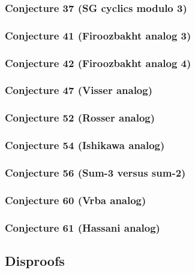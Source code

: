 \documentclass[12pt]{article}
\theoremstyle{remark}
\begin{document}
\subsubsection{Conjecture 37 (SG cyclics modulo 3)}


\subsubsection{Conjecture 41 (Firoozbakht analog 3)}


\subsubsection{Conjecture 42 (Firoozbakht analog 4)}


\subsubsection{Conjecture 47 (Visser analog)}


\subsubsection{Conjecture 52 (Rosser analog)}


\subsubsection{Conjecture 54 (Ishikawa analog)}


\subsubsection{Conjecture 56 (Sum-3 versus sum-2)}


\subsubsection{Conjecture 60 (Vrba analog)}


\subsubsection{Conjecture 61 (Hassani analog)}


\subsection{Disproofs}
\end{document}
